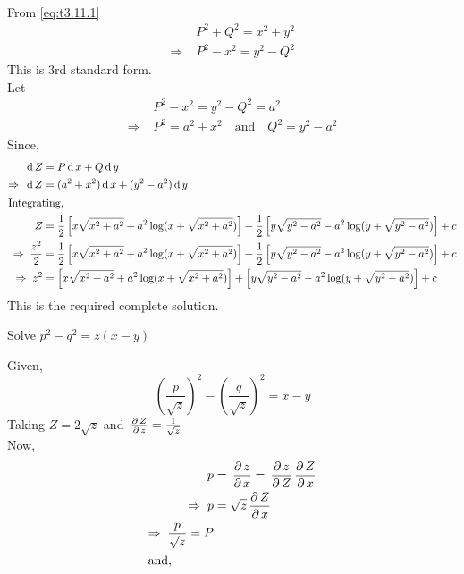 \documentclass[../main-sheet.tex]{subfiles}
\begin{document}
\begin{enumerate}[label=\underline{Type - \Roman*}:]
\begin{soln}
\begin{align*}
        \end{align*}
        From \eqref{eq:t3.11.1}
        \begin{align*}
            &P^2+Q^2=x^2+y^2\\
            \Rightarrow\;&P^2-x^2=y^2-Q^2
        \end{align*}
        This is 3rd standard form.\\
        Let 
        \begin{align*}
            &P^2-x^2=y^2-Q^2=a^2\\
            \Rightarrow\;&P^2=a^2+x^2\quad \text{and}\quad Q^2=y^2-a^2
        \end{align*}
        Since,
        \begin{align*}
            \,\mathrm{d}\, Z&=P \,\mathrm{d}\, x+Q\,\mathrm{d}\, y\\
            \Rightarrow\;\,\mathrm{d}\, Z&=(a^2+x^2)\,\mathrm{d}\, x+(y^2-a^2)\,\mathrm{d}\, y\\
            \intertext{Integrating,}
            Z&=\frac{1}{2}\left[x\sqrt{x^2+a^2}+a^2\log (x+\sqrt{x^2+a^2})\right]+\frac{1}{2}\left[y\sqrt{y^2-a^2}-a^2\log (y+\sqrt{y^2-a^2})\right]+c\\
            \Rightarrow\;\frac{z^2}{2}&=\frac{1}{2}\left[x\sqrt{x^2+a^2}+a^2\log (x+\sqrt{x^2+a^2})\right]+\frac{1}{2}\left[y\sqrt{y^2-a^2}-a^2\log (y+\sqrt{y^2-a^2})\right]+c\\
            \Rightarrow\;z^2&=\left[x\sqrt{x^2+a^2}+a^2\log (x+\sqrt{x^2+a^2})\right]+\left[y\sqrt{y^2-a^2}-a^2\log (y+\sqrt{y^2-a^2})\right]+c
        \end{align*}
        This is the required complete solution.
    \end{soln}
    \begin{prob}
        Solve \(p^2-q^2=z(x-y)\)
    \end{prob}
    \begin{soln}
        Given,
        \begin{equation}
            \left(\frac{p}{\sqrt{z}}\right)^2-\left(\frac{q}{\sqrt{z}}\right)^2=x-y\label{eq:t3.12.1}
        \end{equation}
        Taking \(Z=2\sqrt{z}\) and \(\,\frac{\partial\, Z}{\partial\, z}=\frac{1}{\sqrt{z}}\)\\
        Now,
        \begin{align*}
            p&=\pdx{z}=\pd{z}{Z}\pdx{Z}\\
            \Rightarrow\;p&=\sqrt{z}\pdx{Z}\\
            \Rightarrow\; \frac{p}{\sqrt{z}}=P\\
            \intertext{and,}

\end{align*}
\end{soln}
\end{enumerate}
\end{document}
